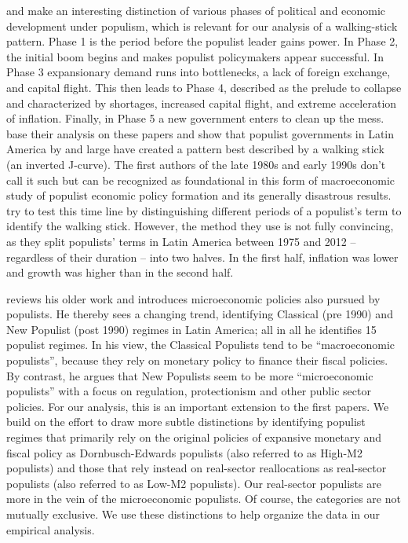 \documentclass{OUP-EJ}
\begin{document}
\cite{DornbuschEdwards1990} and \cite{DornbuschEdwards1991} make an interesting distinction of various phases of political and economic development under populism, which is relevant for our analysis of a walking-stick pattern. Phase 1 is the period before the populist leader gains power. In Phase 2, the initial boom begins and makes populist policymakers appear successful. In Phase 3 expansionary demand runs into bottlenecks, a lack of foreign exchange, and capital flight. This then leads to Phase 4, described as the prelude to collapse and characterized by shortages, increased capital flight, and extreme acceleration of inflation. Finally, in Phase 5 a new government enters to clean up the mess. \cite{BallFreytag2019} base their analysis on these papers and show that populist governments in Latin America by and large have created a pattern best described by a walking stick (an inverted J-curve). The first authors of the late 1980s and early 1990s don’t call it such but can be recognized as foundational in this form of macroeconomic study of populist economic policy formation and its generally disastrous results. \cite{BallFreytag2019} try to test this time line by distinguishing different periods of a populist’s term to identify the walking stick. However, the method they use is not fully convincing, as they split populists’ terms in Latin America between 1975 and 2012 – regardless of their duration – into two halves. In the first half, inflation was lower and growth was higher than in the second half. 

\cite{Edwards2019} reviews his older work and introduces microeconomic policies also pursued by populists. He thereby sees a changing trend, identifying Classical (pre 1990) and New Populist (post 1990) regimes in Latin America; all in all he identifies 15 populist regimes. In his view, the Classical Populists tend to be “macroeconomic populists”, because they rely on monetary policy to finance their fiscal policies. By contrast, he argues that New Populists seem to be more “microeconomic populists” with a focus on regulation, protectionism and other public sector policies. For our analysis, this is an important extension to the first papers.    We build on the effort to draw more subtle distinctions by identifying populist regimes that primarily rely on the original \cite{DornbuschEdwards1990} policies of expansive monetary and fiscal policy as Dornbusch-Edwards populists (also referred to as High-M2 populists) and those that rely instead on real-sector reallocations as real-sector populists (also referred to as Low-M2 populists).  Our real-sector populists are more in the vein of the \cite{Edwards2019} microeconomic populists.  Of course, the categories are not mutually exclusive.  We use these distinctions to help organize the data in our empirical analysis.
\end{document}
